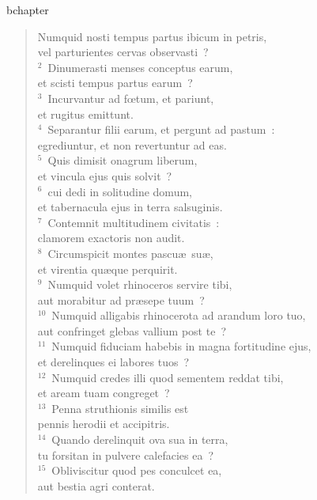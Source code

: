 bchapter\begin{flushleft}\begin{verse}\vspace{-19pt}\hspace{6pt}Numquid nosti tempus partus ibicum in petris,\\\hspace{6pt} vel parturientes cervas observasti~?\\
${}^{2}$~Dinumerasti menses conceptus earum,\\ et scisti tempus partus earum~?\\
${}^{3}$~Incurvantur ad fœtum, et pariunt,\\ et rugitus emittunt.\\
${}^{4}$~Separantur filii earum, et pergunt ad pastum~:\\ egrediuntur, et non revertuntur ad eas.\\
${}^{5}$~Quis dimisit onagrum liberum,\\ et vincula ejus quis solvit~?\\
${}^{6}$~cui dedi in solitudine domum,\\ et tabernacula ejus in terra salsuginis.\\
${}^{7}$~Contemnit multitudinem civitatis~:\\ clamorem exactoris non audit.\\
${}^{8}$~Circumspicit montes pascu\ae\ su\ae ,\\ et virentia qu\ae que perquirit.\\
${}^{9}$~Numquid volet rhinoceros servire tibi,\\ aut morabitur ad pr\ae sepe tuum~?\\
${}^{10}$~Numquid alligabis rhinocerota ad arandum loro tuo,\\ aut confringet glebas vallium post te~?\\
${}^{11}$~Numquid fiduciam habebis in magna fortitudine ejus,\\ et derelinques ei labores tuos~?\\
${}^{12}$~Numquid credes illi quod sementem reddat tibi,\\ et aream tuam congreget~?\\
${}^{13}$~Penna struthionis similis est\\ pennis herodii et accipitris.\\
${}^{14}$~Quando derelinquit ova sua in terra,\\ tu forsitan in pulvere calefacies ea~?\\
${}^{15}$~Obliviscitur quod pes conculcet ea,\\ aut bestia agri conterat.\\

\end{verse}
\end{flushleft}

